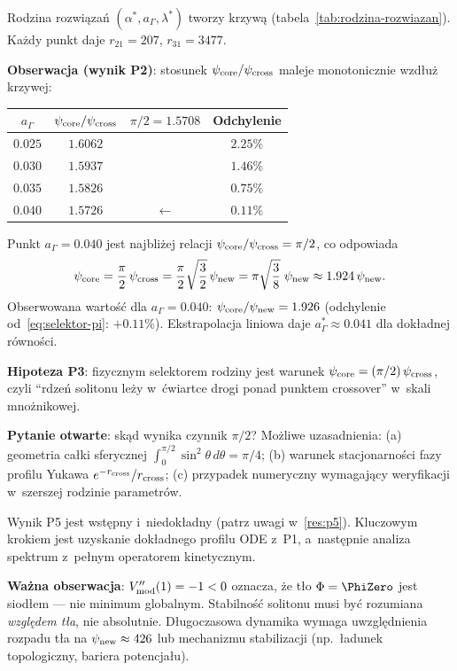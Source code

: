 \begin{problem}%
\label{prob:rodzina}
Rodzina rozwiązań $(\alpha^*, a_\Gamma, \lambda^*)$ tworzy krzywą
(tabela~\ref{tab:rodzina-rozwiazan}).
Każdy punkt daje $r_{21} = 207$, $r_{31} = 3477$.

\textbf{Obserwacja (wynik P2)}: stosunek $\psi_{\rm core}/\psi_{\rm cross}$
maleje monotonicz\-nie wzdłuż krzywej:

\medskip
\begin{center}\small
\begin{tabular}{@{}cccc@{}}
\toprule
$a_\Gamma$ & $\psi_{\rm core}/\psi_{\rm cross}$ & $\pi/2 = 1.5708$ & Odchylenie \\
\midrule
$0.025$ & $1.6062$ & & $2.25\%$ \\
$0.030$ & $1.5937$ & & $1.46\%$ \\
$0.035$ & $1.5826$ & & $0.75\%$ \\
$0.040$ & $1.5726$ & $\leftarrow$ & $0.11\%$ \\
\bottomrule
\end{tabular}
\end{center}
\medskip

Punkt $a_\Gamma = 0.040$ jest najbliżej relacji $\psi_{\rm core}/\psi_{\rm cross} = \pi/2$,
co odpowiada
\begin{equation}\label{eq:selektor-pi}
    \psi_{\rm core} = \frac{\pi}{2}\,\psi_{\rm cross}
    = \frac{\pi}{2}\sqrt{\frac{3}{2}}\,\psi_{\rm new}
    = \pi\sqrt{\frac{3}{8}}\;\psi_{\rm new}
    \approx 1.924\,\psi_{\rm new}.
\end{equation}
Obserwowana wartość dla $a_\Gamma=0.040$: $\psi_{\rm core}/\psi_{\rm new} = 1.926$
(odchylenie od~\eqref{eq:selektor-pi}: $+0.11\%$).
Ekstrapolacja liniowa daje $a_\Gamma^* \approx 0.041$ dla dokładnej równości.

\textbf{Hipoteza P3}: fizycznym selektorem rodziny jest warunek
$\psi_{\rm core} = (\pi/2)\,\psi_{\rm cross}$,
czyli ``rdzeń solitonu leży w~ćwiartce drogi ponad punktem crossover''
w~skali mnożnikowej.

\textbf{Pytanie otwarte}: skąd wynika czynnik $\pi/2$?
Możliwe uzasadnienia:
(a) geometria całki sferycznej $\int_0^{\pi/2} \sin^2\theta\,d\theta = \pi/4$;
(b) warunek stacjonarności fazy profilu Yukawa $e^{-r_{\rm cross}}/r_{\rm cross}$;
(c) przypadek numeryczny wymagający weryfikacji w~szerszej rodzinie parametrów.
\end{problem}

\begin{problem}%
\label{prob:stabilnosc-M3}
Wynik P5 jest wstępny i~niedokładny (patrz uwagi w~\ref{res:p5}).
Kluczowym krokiem jest uzyskanie dokładnego profilu ODE z~P1,
a~następnie analiza spektrum z~pełnym operatorem kinetycznym.

\textbf{Ważna obserwacja}: $V''_{\rm mod}(1) = -1 < 0$ oznacza, że
tło $\Phi = \PhiZero$ jest siodłem — nie minimum globalnym.
Stabilność solitonu musi być rozumiana \emph{względem tła},
nie absolutnie. Długoczasowa dynamika wymaga uwzględnienia
rozpadu tła na $\psi_{\rm new} \approx 426$ lub mechani\-zmu
stabilizacji (np.\ ładunek topologiczny, bariera potencjału).
\end{problem}

